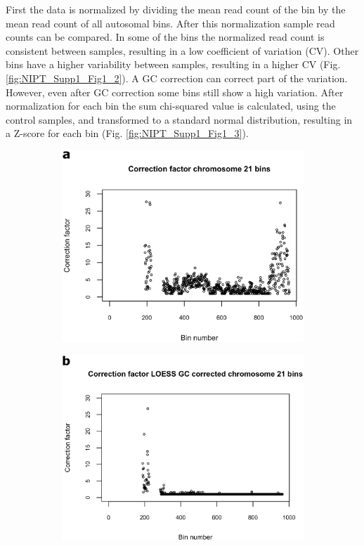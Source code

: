\noindent First the data is normalized by dividing the mean read count of the bin by the mean read count of all autosomal bins. 
After this normalization sample read counts can be compared. 
In some of the bins the normalized read count is consistent between samples, resulting in a low coefficient of variation (CV). 
Other bins have a higher variability between samples, resulting in a higher CV (Fig. \ref{fig:NIPT_Supp1_Fig1_2}).
A GC correction can correct part of the variation. However, even after GC correction some bins still show a high variation.
After normalization for each bin the sum chi-squared value is calculated, using the control samples, and transformed to a standard normal distribution, resulting in a Z-score for each bin (Fig. \ref{fig:NIPT_Supp1_Fig1_3}).

\begin{figure}[h]
	\begin{subfigure}{.5\textwidth}
		\centering
		\includegraphics[width=1\linewidth]{img/NIPT_Supp1_Fig1_4a}
		\label{fig:NIPT_Supp1_Fig1_4a}
	\end{subfigure}%
	\begin{subfigure}{.5\textwidth}
		\centering
		\includegraphics[width=1\linewidth]{img/NIPT_Supp1_Fig1_4b}

\end{subfigure}
\end{figure}
